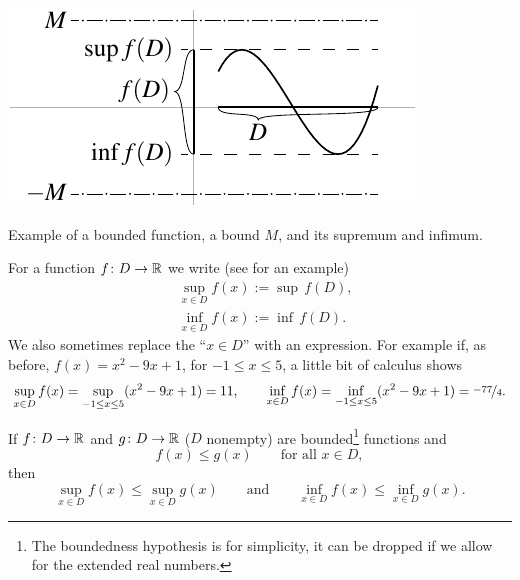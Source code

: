 \begin{myfigureht}
\includegraphics{figures/boundedfunc}
\caption{Example of a bounded function, a bound $M$, and its supremum and infimum.\label{boundedfuncfig}}
\end{myfigureht}
For a function $f \colon D \to {\mathbb{R}}$ we write
(see  for
an example)
\begin{align*}
& \sup_{x \in D} f(x) := \sup\, f(D) , \\
& \inf_{x \in D} f(x) := \inf\, f(D) .
\end{align*}
We also sometimes replace the ``$x \in D$'' with an expression.
For example if, as before, $f(x) = x^2-9x+1$, for $-1 \leq x \leq 5$, 
a little bit of calculus shows
\begin{equation*}
\sup_{x \in D} f(x) = 
\sup_{-1 \leq x \leq 5} ( x^2 -9x+1 ) = 11,
\qquad
\inf_{x \in D} f(x) = 
\inf_{-1 \leq x \leq 5} ( x^2 -9x+1 ) = \nicefrac{-77}{4} .
\end{equation*}



\begin{prop} \label{prop:funcsupinf}
If $f \colon D \to {\mathbb{R}}$ and $g \colon D \to {\mathbb{R}}$ ($D$ nonempty) are
bounded\footnote{The boundedness hypothesis is for simplicity,
it can be dropped if we allow for the extended real numbers.}
functions and
\begin{equation*}
f(x) \leq g(x) \qquad \text{for all $x \in D$},
\end{equation*}
then
\begin{equation} \label{prop:funcsupinf:eq}
\sup_{x \in D} f(x) \leq \sup_{x \in D} g(x)
\qquad \text{and} \qquad
\inf_{x \in D} f(x) \leq \inf_{x \in D} g(x) .
\end{equation}
\end{prop}

